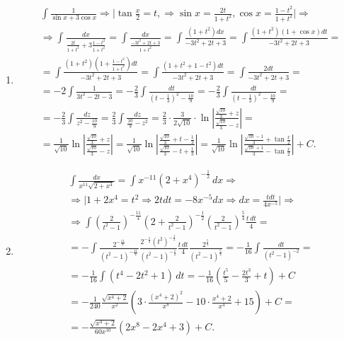 \documentclass[a4paper, 12pt]{article}
\begin{document}
\begin{enumerate}
    \item %
    \begin{align*}
     &\int{\frac{1}{\sin x + 3\cos x}} \Rightarrow 
     \Big| \tan \frac{x}{2}= t,\Rightarrow \sin x = \frac{2t}{1+t^2}, \cos x = \frac{1-t^2}{1+t^2} \Big| \Rightarrow \\
     &\Rightarrow \int{\frac{dx}{\frac{2t}{1+t^2} + 3 \frac{1-t^2}{1+t^2}}}=\int{\frac{dx}{\frac{-3t^2+2t+3}{1+t^2}}} = \int{\frac{(1+t^2)dx}{-3t^2+2t+3}} =      
     \int{\frac{(1+t^2)(1+\cos x)dt}{-3t^2+2t+3}} = \\
     &=\int{\frac{(1+t^2)(1+\frac{1-t^2}{1+t^2})dt}{-3t^2+2t+3}} = \int{\frac{(1+t^2+1-t^2)dt}{-3t^2+2t+3}} = \int{\frac{2dt}{-3t^2+2t+3}} = \\
     &=-2 \int \frac{1}{3t^2-2t-3} =-\frac{2}{3} \int \frac{dt}{(t-\frac{1}{3})^2 - \frac{10}{9}} =-\frac{2}{3} \int \frac{dt}{(t-\frac{1}{3})^2 - \frac{10}{9}} = \\
     &=-\frac{2}{3} \int \frac{dz}{z^2 - \frac{10}{9}} = \frac{2}{3} \int \frac{dz}{\frac{10}{9} - z^2}  = \frac{2}{3} \cdot \frac{3}{2 \sqrt{10}} \cdot \ln |\frac{\frac{\sqrt{10}}{3}+z}{\frac{\sqrt{10}}{3}-z}| = \\
     &=\frac{1}{\sqrt{10}} \ln |\frac{\frac{\sqrt{10}}{3}+z}{\frac{\sqrt{10}}{3}-z}| =  \frac{1}{\sqrt{10}} \ln |\frac{\frac{\sqrt{10}}{3}+t-\frac{1}{3}}{\frac{\sqrt{10}}{3}-t+\frac{1}{3}}| = \frac{1}{\sqrt{10}} \ln |\frac{\frac{\sqrt{10}-1}{3}+\tan \frac{x}{2}}{\frac{\sqrt{10} + 1}{3}-\tan \frac{x}{2}}| + C
    .\end{align*}
    
    \item %
    \begin{align*}
    &\int \frac{dx}{x^{11}\sqrt{2+x^4}} = \int x^{-11}\left(2+x^4\right)^{-\frac{1}{2}}\,dx \Rightarrow \\
    &\Rightarrow \Big| 1+2x^4 = t^2 \Rightarrow 2tdt = -8x^{-5}dx \Rightarrow
    dx = \frac{tdt}{4x^{-5}} \Big| \Rightarrow \\
    &\Rightarrow\int \left(\frac{2}{t^2-1}\right)^{-\frac{11}{4}}\left(2+\frac{2}{t^2-1}\right)^{-\frac{1}{2}}\left(\frac{2}{t^2-1}\right)^{\frac{5}{4}}\frac{t\,dt}{4} =\\    
    &= -\int \frac{2^{-\frac{11}{4}}}{\left(t^2-1\right)^{-\frac{11}{4}}} \frac{2^{-\frac{1}{2}}\left(t^{2}\right)^{-\frac{1}{2}}}{\left(t^2-1\right)^{-\frac{1}{2}}} \frac{t\,dt}{4} \frac{2^{\frac{5}{4}}}{\left(t^2-1\right)^{\frac{5}{4}}} = -\frac{1}{16} \int \frac{dt}{\left(t^2-1\right)^{-2}} = \\
    &= -\frac{1}{16} \int \left(t^4-2t^2+1\right)\,dt = -\frac{1}{16}\left(\frac{t^5}{5}-\frac{2t^3}{3}+t\right) + C \\
    &= -\frac{1}{240}\frac{\sqrt{x^4+2}}{x^2}\left(3\cdot\frac{\left(x^4+2\right)^2}{x^8}-10\cdot\frac{x^4+2}{x^4}+15\right) + C = \\
    &= -\frac{\sqrt{x^4+2}}{60x^{10}}\left(2x^8-2x^4+3\right) + C
   .\end{align*}
   
    \end{enumerate}
   
\end{document}
